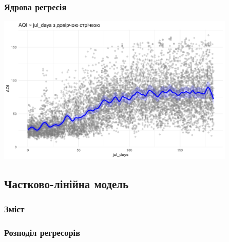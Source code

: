 ﻿\documentclass{beamer}
\begin{document}
\begin{frame}
  \frametitle{Ядрова регресія}
  
  \begin{center}
    \includegraphics[height=2.8in]{plots/lab4/kernal/model1_fit_ribbon.png}
  \end{center}
 
\end{frame}

\begin{frame}
  \section{Частково-лінійна модель}

  \frametitle{Зміст}
  \tableofcontents[currentsection]
\end{frame}

\begin{frame}
  \frametitle{Розподіл регресорів}

\end{frame}
\end{document}
